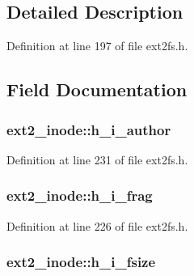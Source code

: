 \subsection{\-Detailed \-Description}


\-Definition at line 197 of file ext2fs.\-h.



\subsection{\-Field \-Documentation}
\hypertarget{structext2__inode_a14358211da4b23cee42cd92276421714}{
\subsubsection[{h\-\_\-i\-\_\-author}]{ {\bf ext2\-\_\-inode\-::h\-\_\-i\-\_\-author}}}\label{structext2__inode_a14358211da4b23cee42cd92276421714}


\-Definition at line 231 of file ext2fs.\-h.

\hypertarget{structext2__inode_a93923220b63886cc8cbf4e799f360b52}{
\subsubsection[{h\-\_\-i\-\_\-frag}]{ {\bf ext2\-\_\-inode\-::h\-\_\-i\-\_\-frag}}}\label{structext2__inode_a93923220b63886cc8cbf4e799f360b52}


\-Definition at line 226 of file ext2fs.\-h.

\hypertarget{structext2__inode_a9655c1fe406844b6d63a6ec028ca5440}{
\subsubsection[{h\-\_\-i\-\_\-fsize}]{ {\bf ext2\-\_\-inode\-::h\-\_\-i\-\_\-fsize}}}\label{structext2__inode_a9655c1fe406844b6d63a6ec028ca5440}


